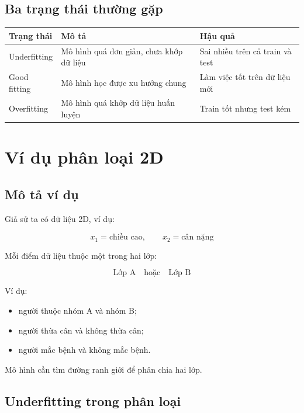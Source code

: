 \subsection{Ba trạng thái thường gặp}

\begin{center}
\begin{tabular}{p{}p{}p{}}
\toprule
Trạng thái & Mô tả & Hậu quả \\
\midrule
Underfitting & Mô hình quá đơn giản, chưa khớp dữ liệu & Sai nhiều trên cả train và test \\
Good fitting & Mô hình học được xu hướng chung & Làm việc tốt trên dữ liệu mới \\
Overfitting & Mô hình quá khớp dữ liệu huấn luyện & Train tốt nhưng test kém \\
\bottomrule
\end{tabular}
\end{center}

\section{Ví dụ phân loại 2D}

\subsection{Mô tả ví dụ}

Giả sử ta có dữ liệu 2D, ví dụ:

\[
    x_1 = \text{chiều cao}, \qquad x_2 = \text{cân nặng}
\]

Mỗi điểm dữ liệu thuộc một trong hai lớp:

\[
    \text{Lớp A} \quad \text{hoặc} \quad \text{Lớp B}
\]

Ví dụ:

\begin{itemize}
    \item người thuộc nhóm A và nhóm B;
    \item người thừa cân và không thừa cân;
    \item người mắc bệnh và không mắc bệnh.
\end{itemize}

Mô hình cần tìm đường ranh giới để phân chia hai lớp.

\subsection{Underfitting trong phân loại}

